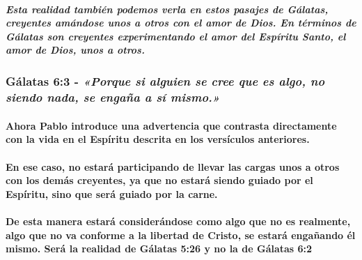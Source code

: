 \documentclass[11a pt,twoside]{article}
\newcommand{\scripture}[1]{%
  {\fontsize{12pt}{16pt}\selectfont\ScriptureFont\itshape #1}%
}
\let\oldsubsubsection\subsubsection
\renewcommand{\subsubsection}{\needspace{4\baselineskip}\oldsubsubsection}
\let\oldparagraph\paragraph
\renewcommand{\paragraph}{\needspace{3\baselineskip}\oldparagraph}
\let\oldsubparagraph\subparagraph
\renewcommand{\subparagraph}{\needspace{2\baselineskip}\oldsubparagraph}
\begin{document}
\subparagraph{Esta realidad también podemos verla en estos pasajes de
Gálatas, creyentes amándose unos a otros con el amor de Dios. En
términos de Gálatas son creyentes experimentando el amor del Espíritu
Santo, el amor de Dios, unos a
otros.}\label{esta-realidad-tambiuxe9n-podemos-verla-en-estos-pasajes-de-guxe1latas-creyentes-amuxe1ndose-unos-a-otros-con-el-amor-de-dios.-en-tuxe9rminos-de-guxe1latas-son-creyentes-experimentando-el-amor-del-espuxedritu-santo-el-amor-de-dios-unos-a-otros.}

\subsubsection{\texorpdfstring{Gálatas 6:3 -
\scripture{«Porque si alguien se cree que es algo, no siendo nada, se engaña a sí mismo.»}}{Gálatas 6:3 - }}\label{guxe1latas-63---porque-si-alguien-se-cree-que-es-algo-no-siendo-nada-se-engauxf1a-a-suxed-mismo.}

\paragraph{Ahora Pablo introduce una advertencia que contrasta
directamente con la vida en el Espíritu descrita en los versículos
anteriores.}\label{ahora-pablo-introduce-una-advertencia-que-contrasta-directamente-con-la-vida-en-el-espuxedritu-descrita-en-los-versuxedculos-anteriores.}

\paragraph{En ese caso, no estará participando de llevar las cargas unos
a otros con los demás creyentes, ya que no estará siendo guiado por el
Espíritu, sino que será guiado por la
carne.}\label{en-ese-caso-no-estaruxe1-participando-de-llevar-las-cargas-unos-a-otros-con-los-demuxe1s-creyentes-ya-que-no-estaruxe1-siendo-guiado-por-el-espuxedritu-sino-que-seruxe1-guiado-por-la-carne.}

\paragraph{De esta manera estará considerándose como algo que no es
realmente, algo que no va conforme a la libertad de Cristo, se estará
engañando él mismo. Será la realidad de Gálatas 5:26 y no la de Gálatas
6:2}\label{de-esta-manera-estaruxe1-consideruxe1ndose-como-algo-que-no-es-realmente-algo-que-no-va-conforme-a-la-libertad-de-cristo-se-estaruxe1-engauxf1ando-uxe9l-mismo.-seruxe1-la-realidad-de-guxe1latas-526-y-no-la-de-guxe1latas-62}
\end{document}
